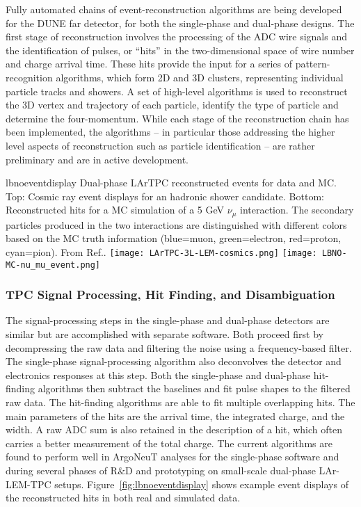 Fully automated chains of event-reconstruction algorithms are being
developed for the DUNE far detector, for both the single-phase and
dual-phase designs.  The first stage of reconstruction involves the
processing of the ADC wire signals and the identification of pulses,
or ``hits'' in the two-dimensional space of wire number and charge
arrival time.  These hits provide the input for a series of
pattern-recognition algorithms, which form 2D and 3D clusters,
representing individual particle tracks and showers.  A set of
high-level algorithms is used to reconstruct the 3D vertex and
trajectory of each particle, identify the type of particle and
determine the four-momentum.  While each stage of the reconstruction
chain has been implemented, the algorithms -- in particular those
addressing the higher level aspects of reconstruction such as particle
identification -- are rather preliminary and are in active
development.


\begin{cdrfigure}{lbnoeventdisplay}
{
Dual-phase LArTPC reconstructed events for data and MC.  Top: Cosmic
ray event displays for an hadronic shower candidate.  Bottom:
Reconstructed hits for a MC simulation of a 5 GeV $\nu_{\mu}$
interaction.  The secondary particles produced in the two interactions
are distinguished with different colors based on the MC truth
information (blue=muon, green=electron, red=proton, cyan=pion).  From
Ref.\cite{Badertscher:2012dq}.  }
\texttt{[image: LArTPC-3L-LEM-cosmics.png]}
\texttt{[image: LBNO-MC-nu\_mu\_event.png]}
\end{cdrfigure}

\subsubsection{TPC Signal Processing, Hit Finding, and Disambiguation}

The signal-processing steps in the single-phase and dual-phase
detectors are similar but are accomplished with separate software.
Both proceed first by decompressing the raw data and filtering the
noise using a frequency-based filter.  The single-phase
signal-processing algorithm also deconvolves the detector and
electronics responses at this step.  Both the single-phase and
dual-phase hit-finding algorithms then subtract the baselines and fit
pulse shapes to the filtered raw data.  The hit-finding algorithms are
able to fit multiple overlapping hits.  The main parameters of the
hits are the arrival time, the integrated charge, and the width.  A
raw ADC sum is also retained in the description of a hit, which often
carries a better measurement of the total charge.  The current
algorithms are found to perform well in ArgoNeuT
analyses\cite{Anderson:2012vc} for the single-phase software and
during several phases of R$\&$D and prototyping on small-scale
dual-phase LAr-LEM-TPC
setups\cite{Badertscher:2008rf,Badertscher:2012dq}.
Figure~\ref{fig:lbnoeventdisplay} shows example event displays of the
reconstructed hits in both real and simulated data.

